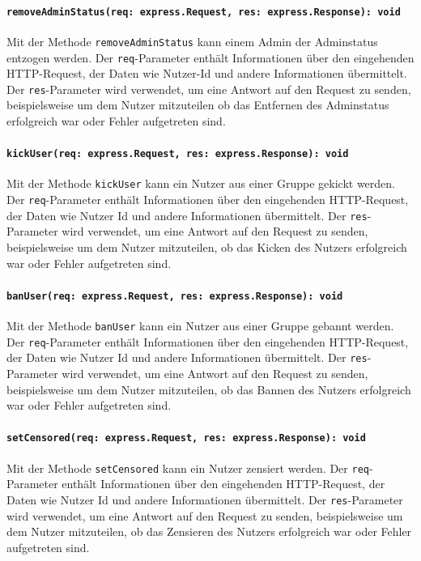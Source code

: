 \documentclass{entwurfsheft}
\begin{document}
\paragraph{\texttt{removeAdminStatus(req: express.Request, res: express.Response): void}}
Mit der Methode \texttt{removeAdminStatus} kann einem Admin der Adminstatus entzogen werden. Der \texttt{req}-Parameter enthält Informationen über den eingehenden HTTP-Request, der Daten wie Nutzer-Id und andere Informationen übermittelt. Der \texttt{res}-Parameter wird verwendet, um eine Antwort auf den Request zu senden, beispielsweise um dem Nutzer mitzuteilen ob das Entfernen des Adminstatus erfolgreich war oder Fehler aufgetreten sind.
\paragraph{\texttt{kickUser(req: express.Request, res: express.Response): void}}
Mit der Methode \texttt{kickUser} kann ein Nutzer aus einer Gruppe gekickt werden. Der \texttt{req}-Parameter enthält Informationen über den eingehenden HTTP-Request, der Daten wie Nutzer Id und andere Informationen übermittelt. Der \texttt{res}-Parameter wird verwendet, um eine Antwort auf den Request zu senden, beispielsweise um dem Nutzer mitzuteilen, ob das Kicken des Nutzers erfolgreich war oder Fehler aufgetreten sind.
\paragraph{\texttt{banUser(req: express.Request, res: express.Response): void}}
Mit der Methode \texttt{banUser} kann ein Nutzer aus einer Gruppe gebannt werden. Der \texttt{req}-Parameter enthält Informationen über den eingehenden HTTP-Request, der Daten wie Nutzer Id und andere Informationen übermittelt. Der \texttt{res}-Parameter wird verwendet, um eine Antwort auf den Request zu senden, beispielsweise um dem Nutzer mitzuteilen, ob das Bannen des Nutzers erfolgreich war oder Fehler aufgetreten sind.
\paragraph{\texttt{setCensored(req: express.Request, res: express.Response): void}}
Mit der Methode \texttt{setCensored} kann ein Nutzer zensiert werden. Der \texttt{req}-Parameter enthält Informationen über den eingehenden HTTP-Request, der Daten wie Nutzer Id und andere Informationen übermittelt. Der \texttt{res}-Parameter wird verwendet, um eine Antwort auf den Request zu senden, beispielsweise um dem Nutzer mitzuteilen, ob das Zensieren des Nutzers erfolgreich war oder Fehler aufgetreten sind.
\end{document}
